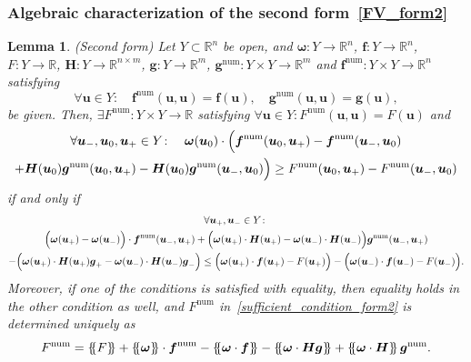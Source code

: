 \documentclass[]{scrartcl}
\newcommand*{\ldblbrace}{\{\mskip-5mu \left \{}
\newcommand*{\rdblbrace}{ \}\mskip-5mu \right \}}
\newcommand{\mean}[1]{\left\ldblbrace #1 \right\rdblbrace}
\renewcommand{\vec}[1]{\boldsymbol{#1}}
\newtheorem{lemma}[theorem]{Lemma}
\theoremstyle{definition}
\begin{document}
\subsubsection{Algebraic characterization of the second form\texorpdfstring{~\eqref{FV_form2}}{}}

\begin{lemma}{\label{algebraic_lemma_nc_form2}(Second form)}
Let $Y \subset \mathbb{R}^n$ be open, and $\vec{\omega}\colon Y \to \mathbb{R}^n$, $\vec{f}\colon Y \to \mathbb{R}^n$, $F\colon Y \to \mathbb{R}$, $\vec{H}\colon Y \to \mathbb{R}^{n \times m}$, $\vec{g}\colon Y \to \mathbb{R}^m$, $\vec{g}^{\mathrm{num}}\colon Y \times Y \to \mathbb{R}^m$ and $\vec{f}^{\mathrm{num}}\colon Y \times Y \to \mathbb{R}^n$  satisfying
\begin{equation}
\forall \vec{u} \in Y\colon \quad \vec{f}^\mathrm{num}(\vec{u},\vec{u}) = \vec{f}(\vec{u}), \quad \vec{g}^\mathrm{num}(\vec{u},\vec{u}) = \vec{g}(\vec{u}),
\end{equation}
be given. Then,
$\exists F^\mathrm{num}\colon Y \times Y \to \mathbb{R}$ satisfying $\forall \vec{u}\in Y\colon F^\mathrm{num}(\vec{u},\vec{u}) = F(\vec{u})$ and
\begin{multline}
    \forall \vec{u}_-, \vec{u}_0, \vec{u}_+ \in Y\colon \quad \vec{\omega}(\vec{u}_0) \cdot \Bigl (  \vec{f}^\mathrm{num}(\vec{u}_0, \vec{u}_+) - \vec{f}^\mathrm{num}(\vec{u}_-, \vec{u}_0) \\+ \vec{H} (\vec{u}_0)  \vec{g}^\mathrm{num}(\vec{u}_0, \vec{u}_+) - \vec{H}(\vec{u}_0)\vec{g}^\mathrm{num}(\vec{u}_-, \vec{u}_0)  \Bigr ) \geq F^\mathrm{num}(\vec{u}_0, \vec{u}_+) - F^\mathrm{num}(\vec{u}_-, \vec{u}_0)
    \label{sufficient_condition_form2}
\end{multline}
if and only if
\begin{multline}
    \forall \vec{u}_+, \vec{u}_- \in Y\colon
    \\
    \Bigl (\vec{\omega}(\vec{u}_+) - \vec{\omega}(\vec{u}_-) \Bigr )
    \cdot \vec{f}^\mathrm{num}(\vec{u}_-, \vec{u}_+)
    + \Bigl (\vec{\omega}(\vec{u}_+) \cdot \vec{H}(\vec{u}_+) - \vec{\omega}(\vec{u}_-) \cdot \vec{H}(\vec{u}_-)  \Bigr ) \vec{g}^{\mathrm{num}}(\vec{u}_-, \vec{u}_+)
    \\
    - \Bigl ( \vec{\omega}(\vec{u}_+) \cdot \vec{H}(\vec{u}_+) \vec{g}_+ - \vec{\omega}(\vec{u}_-) \cdot \vec{H}(\vec{u}_-) \vec{g}_- \Bigr )\leq  \Bigl ( \vec{\omega}(\vec{u}_+) \cdot \vec{f}(\vec{u}_+) - F(\vec{u}_+) \Bigr ) - \Bigl (\vec{\omega}(\vec{u}_-) \cdot \vec{f}(\vec{u}_-) - F(\vec{u}_-) \Bigr ).
\label{necessary_condition_form2}
\end{multline}
Moreover, if one of the conditions is satisfied with equality, then equality holds in the other condition as well, and $F^{\mathrm{num}}$ in~\eqref{sufficient_condition_form2} is determined uniquely as
\begin{equation}
F^{\mathrm{num}} = \mean{F} + \mean{\vec{\omega}} \cdot \vec{f}^{\mathrm{num}}-\mean{\vec{\omega} \cdot \vec{f}}  - \mean{\vec{\omega} \cdot \vec{H} \vec{g}} + \mean{\vec{\omega} \cdot \vec{H}} \vec{g}^{\mathrm{num}}.
\label{F_num_form2}
\end{equation}
\end{lemma}
\end{document}
